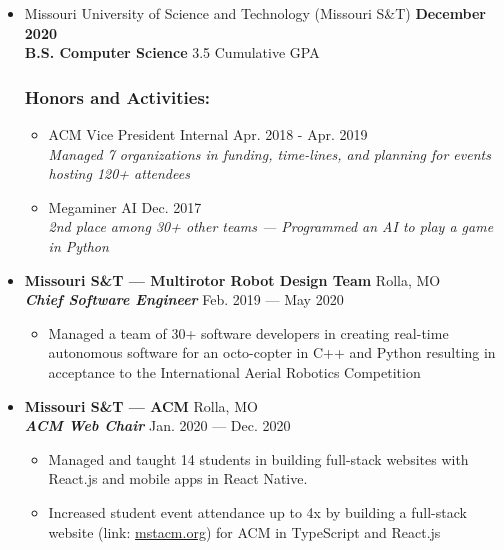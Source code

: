 \documentclass[9pt,oneside]{memoir}
\newcommand{\cgpa}{3.5}
\begin{document}
\begin{itemize}
      \item[] Missouri University of Science and Technology (Missouri S\&T)
            \hfill \textbf{December 2020}\\
            \textbf{B.S. Computer Science}
            \hfill \cgpa{} Cumulative GPA

\vspace*{-10px}
\subsubsection*{Honors and Activities:}

\begin{itemize}
      \item[\textbullet] ACM Vice President Internal
            \hfill Apr. 2018 - Apr. 2019\\
            \textit{Managed 7 organizations in funding, time-lines, and planning for events hosting 120+ attendees}
      \item[\textbullet] Megaminer AI
            \hfill Dec. 2017\\
            \textit{2nd place among 30+ other teams --- Programmed an AI to play a game in Python}
\end{itemize}
   
     \vspace*{-1px}
      \item[] \textbf{Missouri S\&T --- Multirotor Robot Design Team}
            \hfill Rolla, MO\\
            \textit{\textbf{Chief Software Engineer}}
            \hfill Feb. 2019 --- May 2020
            \begin{itemize}
                  \item[\textbullet] Managed a team of 30+ software developers in
                        creating real-time autonomous software for an octo-copter in C++ and Python resulting in
                        acceptance to the International Aerial Robotics Competition
            \end{itemize}
            
      \item[] \textbf{Missouri S\&T --- ACM}
            \hfill Rolla, MO\\
            \textit{\textbf{ACM Web Chair}}
            \hfill Jan. 2020 --- Dec. 2020
            \begin{itemize}
                  \item[\textbullet] Managed and taught 14 students in building full-stack websites with React.js and mobile apps in React Native.
                  \item[\textbullet] Increased student event attendance up to 4x by building a full-stack website (link: \url{mstacm.org}) for ACM in TypeScript and React.js
            \end{itemize}

\end{itemize}
\end{document}
